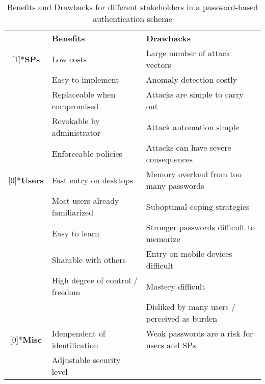 \begin{table}[htbp]
  \centering
  \caption{\label{table:rw:benefits_drawbacks_pws}Benefits and Drawbacks for different stakeholders in a password-based authentication scheme}
    \begin{tabular}{c|lr}
	\cmidrule{2-3}    \multicolumn{1}{r}{} & \textbf{Benefits} & \multicolumn{1}{l}{\textbf{Drawbacks}} \\
	\cmidrule{2-3}    \rowcolor[rgb]{ .949,  .949,  .949} \multirow{5}[1]{*}{\textbf{SPs}} & Low costs & \multicolumn{1}{l}{Large number of attack vectors} \\
	\rowcolor[rgb]{ .949,  .949,  .949}       & Easy to implement & \multicolumn{1}{l}{Anomaly detection costly} \\
	\rowcolor[rgb]{ .949,  .949,  .949}       & Replaceable when compromised & \multicolumn{1}{l}{Attacks are simple to carry out} \\
	\rowcolor[rgb]{ .949,  .949,  .949}       & Revokable by administrator & \multicolumn{1}{l}{Attack automation simple} \\
	\rowcolor[rgb]{ .949,  .949,  .949}       & Enforceable policies & \multicolumn{1}{l}{Attacks can have severe consequences} \\
	\rowcolor[rgb]{ .886,  .937,  .855} \multirow{6}[0]{*}{\textbf{Users}} & Fast entry on desktops & \multicolumn{1}{l}{Memory overload from too many passwords} \\
	\rowcolor[rgb]{ .886,  .937,  .855}       & Most users already familiarized & \multicolumn{1}{l}{Suboptimal coping strategies} \\
	\rowcolor[rgb]{ .886,  .937,  .855}       & Easy to learn & \multicolumn{1}{l}{Stronger passwords difficult to memorize} \\
	\rowcolor[rgb]{ .886,  .937,  .855}       & Sharable with others & \multicolumn{1}{l}{Entry on mobile devices difficult} \\
	\rowcolor[rgb]{ .886,  .937,  .855}       & High degree of control / freedom & \multicolumn{1}{l}{Mastery difficult} \\
	\rowcolor[rgb]{ .886,  .937,  .855}       &       & \multicolumn{1}{l}{Disliked by many users / perceived as burden} \\
	\rowcolor[rgb]{ .851,  .882,  .949} \multirow{2}[0]{*}{\textbf{Misc}} & Idenpendent of identification & \multicolumn{1}{l}{Weak passwords are a risk for users and SPs } \\
	\rowcolor[rgb]{ .851,  .882,  .949}       & Adjustable security level &  \\
	\end{tabular}%
\end{table}%